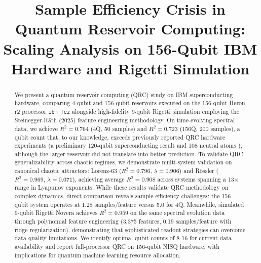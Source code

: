 \documentclass[conference]{IEEEtran}
\begin{document}
\pagestyle{plain}  %

\title{Sample Efficiency Crisis in Quantum Reservoir Computing: \\
\large Scaling Analysis on 156-Qubit IBM Hardware and Rigetti Simulation}

\author{
}

\maketitle

\begin{abstract}
We present a quantum reservoir computing (QRC) study on IBM superconducting hardware, comparing 4-qubit and 156-qubit reservoirs executed on the 156-qubit Heron r2 processor \texttt{ibm\_fez} alongside high-fidelity 9-qubit Rigetti simulation employing the Steinegger-Räth (2025) feature engineering methodology. On time-evolving spectral data, we achieve $R^2=0.764$ (4Q, 50 samples) and $R^2=0.723$ (156Q, 200 samples), a qubit count that, to our knowledge, exceeds previously reported QRC hardware experiments (a preliminary 120-qubit superconducting result \cite{yasuda2023quantum} and 108 neutral atoms \cite{kornjaca2024largescale}), although the larger reservoir did not translate into better prediction. To validate QRC generalizability across chaotic regimes, we demonstrate multi-system validation on canonical chaotic attractors: Lorenz-63 ($R^2=0.796$, $\lambda=0.906$) and Rössler ($R^2=0.969$, $\lambda=0.071$), achieving average $R^2=0.908$ across systems spanning a 13$\times$ range in Lyapunov exponents. While these results validate QRC methodology on complex dynamics, direct comparison reveals sample efficiency challenges: the 156-qubit system operates at 1.28 samples/feature versus 5.0 for 4Q. Meanwhile, simulated 9-qubit Rigetti Novera achieves $R^2=0.959$ on the same spectral evolution data through polynomial feature engineering (3,375 features, 0.19 samples/feature with ridge regularization), demonstrating that sophisticated readout strategies can overcome data quality limitations. We identify optimal qubit counts of 8-16 for current data availability and report full-processor QRC on 156-qubit NISQ hardware, with implications for quantum machine learning resource allocation.
\end{abstract}
\end{document}
